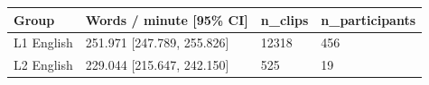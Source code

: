\begin{tabular}{llll}
\toprule
Group & Words / minute [95\% CI] & n\_clips & n\_participants \\
\midrule
L1 English & 251.971 [247.789, 255.826] & 12318 & 456 \\
L2 English & 229.044 [215.647, 242.150] & 525 & 19 \\
\bottomrule
\end{tabular}
